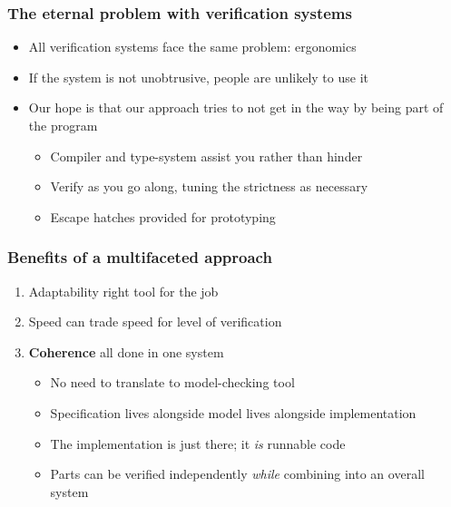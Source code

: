 \documentclass[compress,handout]{beamer}
\begin{document}
\begin{frame}
  \frametitle{The eternal problem with verification systems}

  \begin{itemize}
    \item<1-> All verification systems face the same problem: ergonomics
    \item<2-> If the system is not unobtrusive, people are unlikely to use it
    \item<3-> Our hope is that our approach tries to not get in the way by being
              part of the program
      \begin{itemize}
        \item<4-> Compiler and type-system assist you rather than hinder
        \item<5-> Verify as you go along, tuning the strictness as necessary
        \item<6-> Escape hatches provided for prototyping
      \end{itemize}
  \end{itemize}

\end{frame}


\begin{frame}
  \frametitle{Benefits of a multifaceted approach}

  \begin{enumerate}
    \item<1-> Adaptability {\textemdash} right tool for the job
    \item<2-> Speed {\textemdash} can trade speed for level of verification
    \item<3-> \textbf{Coherence} {\textemdash} all done in one system
      \begin{itemize}
        \item<4-> No need to translate to model-checking tool
        \item<5-> Specification lives alongside model lives alongside
                  implementation
        \item<6-> The implementation is just there; it \emph{is} runnable code
        \item<7-> Parts can be verified independently \emph{while} combining into an
                  overall system
      \end{itemize}
  \end{enumerate}

\end{frame}
\end{document}
